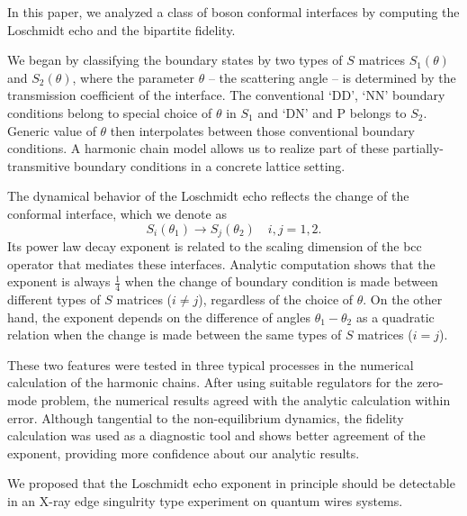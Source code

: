 
In this paper, we analyzed a class of boson conformal interfaces by computing the Loschmidt echo and the bipartite fidelity. 

We began by classifying the boundary states by two types of $S$ matrices $S_1(\theta)$ and $S_2(\theta)$, where the parameter $\theta$ -- the scattering angle -- is determined by the transmission coefficient of the interface. The conventional `DD', `NN' boundary conditions belong to special choice of $\theta$ in $S_1$ and  `DN' and P belongs to $S_2$. Generic value of $\theta$ then interpolates between those conventional boundary conditions. A harmonic chain model allows us to realize part of these partially-transmitive boundary conditions in a concrete lattice setting. 

The dynamical behavior of the Loschmidt echo reflects the change of the conformal interface, which we denote as
\begin{equation}
S_i( \theta_1 ) \rightarrow S_j( \theta_2 )  \quad i, j = 1, 2. 
\end{equation}
Its power law decay exponent is related to the scaling dimension of the bcc operator that mediates these interfaces. Analytic computation shows that the exponent is always $\frac{1}{4}$ when the change of boundary condition is made between different types of $S$ matrices ($i \ne j$), regardless of the choice of $\theta$. On the other hand, the exponent depends on the difference of angles $\theta_1 - \theta_2$ as a quadratic relation when the change is made between the same types of $S$ matrices ($i = j$).

These two features were tested in three typical processes in the numerical calculation of the harmonic chains. After using suitable regulators for the zero-mode problem, the numerical results agreed with the analytic calculation within error. Although tangential to the non-equilibrium dynamics, the fidelity calculation was used as a diagnostic tool and shows better agreement of the exponent, providing more confidence about our analytic results. 

We proposed that the Loschmidt echo exponent in principle should be detectable in an X-ray edge singulrity type experiment on quantum wires systems. 

